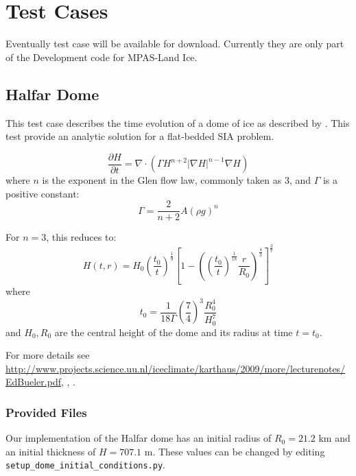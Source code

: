 \chapter{Test Cases}
\label{chap:landice_test_cases}

Eventually test case will be available for download.  Currently they are only part of the Development code for MPAS-Land Ice.


\FloatBarrier


\section{Halfar Dome}
\label{sec:halfar_description}
This test case describes the time evolution of a dome of ice as described by \citet{Halfar1983}.
This test provide an analytic solution for a flat-bedded SIA problem.

\begin{equation}
    \label{halfar}
    \frac{\partial H}{\partial t} = \nabla \cdot (\Gamma H^{n+2} |\nabla H|^{n-1} \nabla H)
\end{equation}
where $n$ is the exponent in the Glen flow law, commonly taken as 3, and $\Gamma$ is a positive constant:
\begin{equation}
    \Gamma = \frac{2}{n+2} A (\rho g)^n
\end{equation}

For $n=3$, this reduces to:
\begin{equation}
    H(t,r) = H_0 \left(\frac{t_0}{t}\right)^\frac{1}{9}  \left[ 1 - \left(  \left( \frac{t_0}{t} \right) ^ \frac{1}{18} \frac{r}{R_0} \right)^\frac{4}{3} \right] ^ \frac{3}{7}
\end{equation}
where
\begin{equation}
    t_0 = \frac{1}{18\Gamma} \left( \frac{7}{4} \right)^3 \frac{R_0^4}{H_0^7}
\end{equation}
and $H_0, R_0$ are the central height of the dome and its radius at time $t=t_0$.

For more details see \url{http://www.projects.science.uu.nl/iceclimate/karthaus/2009/more/lecturenotes/EdBueler.pdf},  \citet{Bueler2005}, \citet{Halfar1983}.



\subsection{Provided Files}
\label{subsec:halfar_files}
Our implementation of the Halfar dome has an initial radius of $R_0=21.2$ km and an initial thickness of $H=707.1$ m.
These values can be changed by editing \texttt{setup\_dome\_initial\_conditions.py}.

